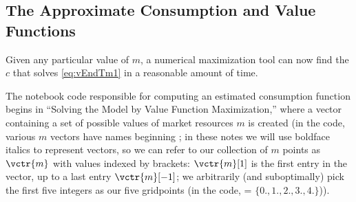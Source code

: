 \documentclass[titlepage, headings=optiontotocandhead]{econtex}
\begin{document}
\hypertarget{the-approximate-consumption-and-value-functions}{}
\subsection{The Approximate Consumption and Value Functions}

Given any particular value of $m$, a numerical maximization tool can now find the $c$ that solves \eqref{eq:vEndTm1} in a reasonable amount of time.

The notebook code responsible for computing an estimated consumption function begins in ``Solving the Model by Value Function Maximization,'' where a vector containing a set of possible values of market resources $m$ is created (in the code, various $m$ vectors have names beginning {\mVec}; in these notes we will use boldface italics to represent vectors, so we can refer to our collection of $m$ points as $\vctr{m}$ with values indexed by brackets: $\vctr{m}[1]$ is the first entry in the vector, up to a last entry $\vctr{m}[-1]$; we arbitrarily (and suboptimally) pick the first five integers as our five {\mVec}  gridpoints (in the code, = $\{0.,1.,2.,3.,4.\}$)).

\end{document}
